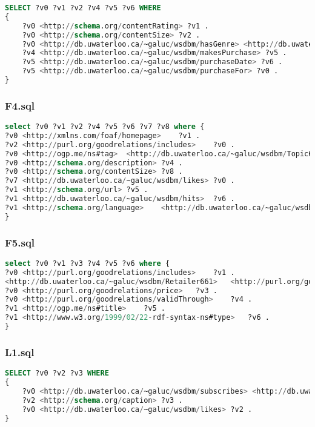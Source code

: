 \documentclass[titlepage, a4paper, 12pt] {article}
\begin{document}
\begin{lstlisting}[language=SQL] 
SELECT ?v0 ?v1 ?v2 ?v4 ?v5 ?v6 WHERE 
{
	?v0 <http://schema.org/contentRating> ?v1 .
	?v0 <http://schema.org/contentSize> ?v2 .
	?v0 <http://db.uwaterloo.ca/~galuc/wsdbm/hasGenre> <http://db.uwaterloo.ca/~galuc/wsdbm/SubGenre59> .
	?v4 <http://db.uwaterloo.ca/~galuc/wsdbm/makesPurchase> ?v5 .
	?v5 <http://db.uwaterloo.ca/~galuc/wsdbm/purchaseDate> ?v6 .
	?v5 <http://db.uwaterloo.ca/~galuc/wsdbm/purchaseFor> ?v0 .
}
\end{lstlisting}

\subsubsection{F4.sql}

\begin{lstlisting}[language=SQL]
select ?v0 ?v1 ?v2 ?v4 ?v5 ?v6 ?v7 ?v8 where {
?v0	<http://xmlns.com/foaf/homepage>	?v1 . 
?v2	<http://purl.org/goodrelations/includes>	?v0 . 
?v0	<http://ogp.me/ns#tag>	<http://db.uwaterloo.ca/~galuc/wsdbm/Topic60> . 
?v0	<http://schema.org/description>	?v4 . 
?v0	<http://schema.org/contentSize>	?v8 . 
?v7	<http://db.uwaterloo.ca/~galuc/wsdbm/likes>	?v0 . 
?v1	<http://schema.org/url>	?v5 . 
?v1	<http://db.uwaterloo.ca/~galuc/wsdbm/hits>	?v6 . 
?v1	<http://schema.org/language>	<http://db.uwaterloo.ca/~galuc/wsdbm/Language0> . 
} 
\end{lstlisting}

\subsubsection{F5.sql}

\begin{lstlisting}[language=SQL]
select ?v0 ?v1 ?v3 ?v4 ?v5 ?v6 where {
?v0	<http://purl.org/goodrelations/includes>	?v1 . 
<http://db.uwaterloo.ca/~galuc/wsdbm/Retailer661>	<http://purl.org/goodrelations/offers>	?v0 . 
?v0	<http://purl.org/goodrelations/price>	?v3 . 
?v0	<http://purl.org/goodrelations/validThrough>	?v4 . 
?v1	<http://ogp.me/ns#title>	?v5 . 
?v1	<http://www.w3.org/1999/02/22-rdf-syntax-ns#type>	?v6 . 
}
\end{lstlisting}

\subsubsection{L1.sql}

\begin{lstlisting}[language=SQL] 
SELECT ?v0 ?v2 ?v3 WHERE 
{
	?v0 <http://db.uwaterloo.ca/~galuc/wsdbm/subscribes> <http://db.uwaterloo.ca/~galuc/wsdbm/Website38303> .
	?v2 <http://schema.org/caption> ?v3 .
	?v0 <http://db.uwaterloo.ca/~galuc/wsdbm/likes> ?v2 .
}
\end{lstlisting}
\end{document}
